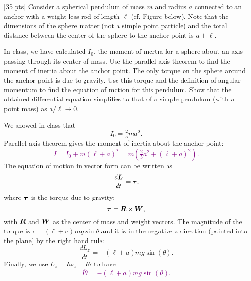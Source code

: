 \documentclass[12pt]{article}
\begin{document}


\begin{ex}

  [35 pts] Consider a spherical pendulum of mass $m$ and radius $a$ connected to an anchor with a weight-less rod of length $\ell$ (cf. Figure below). Note that the dimensions of the sphere matter (not a simple point particle) and the total distance between the center of the sphere to the anchor point is $a+\ell$.

  In class, we have calculated $I_0$, the moment of inertia for a sphere about an axis passing through its center of mass. Use the parallel axis theorem to find the moment of inertia about the anchor point. The only torque on the sphere around the anchor point is due to gravity. Use this torque and the definition of angular momentum to find the equation of motion for this pendulum. Show that the obtained differential equation simplifies to that of a simple pendulum (with a point mass) as $a/\ell\to0$.

\begin{figure}[!h]
\begin{center}
\end{center}
\end{figure}

\begin{solution}
  We showed in class that
  $$I_0=\tfrac{2}{5}ma^2.$$
  Parallel axis theorem gives the moment of inertia about the anchor point:\textcolor{purple}{
  $$I=I_0+m(\ell+a)^2=m\left(\tfrac{2}{5}a^2+(\ell+a)^2\right).$$}%
  The equation of motion in vector form can be written as
  $$\frac{d\boldsymbol{L}}{dt}=\boldsymbol{\tau},$$
  where $\boldsymbol{\tau}$ is the torque due to gravity:
  $$\boldsymbol{\tau}=\boldsymbol{R}\times\boldsymbol{W},$$
  with $\boldsymbol{R}$ and $\boldsymbol{W}$ as the center of mass and weight vectors. The magnitude of the torque is $\tau=(\ell+a)mg\sin{\theta}$ and it is in the negative $z$ direction (pointed into the plane) by the right hand rule:
  $$\frac{dL_z}{dt}=-(\ell+a)mg\sin(\theta).$$
  Finally, we use $L_z=I\dot{\omega}_z=I\ddot{\theta}$ to have\textcolor{purple}{
    $$I\ddot{\theta}=-(\ell+a)mg\sin(\theta).$$}%


\end{solution}
\end{ex}
\end{document}
